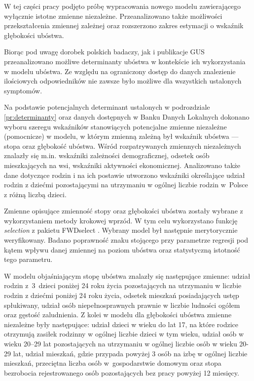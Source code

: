 W tej części pracy podjęto próbę wypracowania nowego modelu zawierającego wyłącznie istotne zmienne niezależne. Przeanalizowano także możliwości przekształcenia zmiennej zależnej oraz rozszerzono zakres estymacji o wskaźnik głębokości ubóstwa. 

Biorąc pod uwagę dorobek polskich badaczy, jak i publikacje GUS przeanalizowano możliwe determinanty ubóstwa w kontekście ich wykorzystania w modelu ubóstwa. Ze względu na ograniczony dostęp do danych znalezienie ilościowych odpowiedników nie zawsze było możliwe dla wszystkich ustalonych symptomów.

Na podstawie potencjalnych determinant ustalonych w podrozdziale \ref{pr:determinanty} oraz danych dostępnych w Banku Danych Lokalnych dokonano wyboru szeregu wskaźników stanowiących potencjalne zmienne niezależne (pomocnicze) w modelu, w którym zmienną zależną był wskaźnik ubóstwa --- stopa oraz głębokość ubóstwa. Wśród rozpatrywanych zmiennych niezależnych znalazły się m.in. wskaźniki zależności demograficznej, odsetek osób mieszkających na wsi, wskaźniki aktywności ekonomicznej. Analizowano także dane dotyczące rodzin i na ich postawie utworzono wskaźniki określające udział rodzin z dziećmi pozostającymi na utrzymaniu w ogólnej liczbie rodzin w~Polsce z różną liczbą dzieci.

Zmienne opisujące zmienność stopy oraz głębokości ubóstwa zostały wybrane z wykorzystaniem metody krokowej wprzód. W tym celu wykorzystano funkcję \emph{selection} z pakietu FWDselect \citep{fwdselect2015}. Wybrany model był następnie merytorycznie weryfikowany. Badano poprawność znaku stojącego przy parametrze regresji pod kątem wpływu danej zmiennej na poziom ubóstwa oraz statystyczną istotność tego parametru.

W modelu objaśniającym stopę ubóstwa znalazły się następujące zmienne: udział rodzin z~3~dzieci poniżej 24 roku życia pozostających na utrzymaniu w liczbie rodzin z dziećmi poniżej 24 roku życia, odsetek mieszkań posiadających ustęp spłukiwany, udział osób niepełnosprawnych prawnie w liczbie ludności ogółem oraz gęstość zaludnienia. Z kolei w modelu dla głębokości ubóstwa zmienne niezależne były następujące: udział dzieci w wieku do lat 17, na które rodzice otrzymują zasiłek rodzinny w ogólnej liczbie dzieci w tym wieku, udział osób w wieku 20--29 lat pozostających na utrzymaniu w ogólnej liczbie osób w wieku 20-29 lat, udział mieszkań, gdzie przypada powyżej 3 osób na izbę w ogólnej liczbie mieszkań, przeciętna liczba osób w~gospodarstwie domowym oraz stopa bezrobocia rejestrowanego osób pozostających bez pracy powyżej 12 miesięcy.

